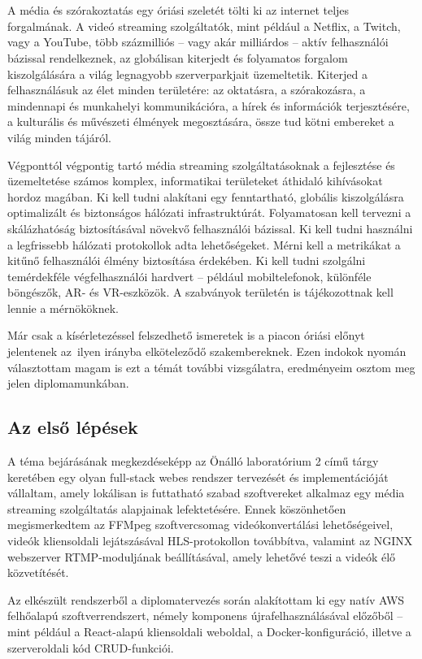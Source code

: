 \chapter{\bevezetes}

A média és szórakoztatás egy óriási szeletét tölti ki az internet teljes forgalmának. A videó streaming szolgáltatók, mint például a Netflix, a Twitch, vagy a YouTube, több százmilliós -- vagy akár milliárdos -- aktív felhasználói bázissal rendelkeznek, az globálisan kiterjedt és folyamatos forgalom kiszolgálására a világ legnagyobb szerverparkjait üzemeltetik. Kiterjed a felhasználásuk az élet minden területére: az oktatásra, a szórakozásra, a mindennapi és munkahelyi kommunikációra, a hírek és információk terjesztésére, a kulturális és művészeti élmények megosztására, össze tud kötni embereket a világ minden tájáról.

Végponttól végpontig tartó média streaming szolgáltatásoknak a fejlesztése és üzemeltetése számos komplex, informatikai területeket áthidaló kihívásokat hordoz magában. Ki kell tudni alakítani egy fenntartható, globális kiszolgálásra optimalizált és biztonságos hálózati infrastruktúrát. Folyamatosan kell tervezni a skálázhatóság biztosításával növekvő felhasználói bázissal. Ki kell tudni használni a legfrissebb hálózati protokollok adta lehetőségeket. Mérni kell a metrikákat a kitűnő felhasználói élmény biztosítása érdekében. Ki kell tudni szolgálni temérdekféle végfelhasználói hardvert -- például mobiltelefonok, különféle böngészők, AR- és VR-eszközök. A szabványok területén is tájékozottnak kell lennie a mérnököknek.

Már csak a kísérletezéssel felszedhető ismeretek is a piacon óriási előnyt jelentenek az~ilyen irányba elköteleződő szakembereknek. Ezen indokok nyomán választottam magam is ezt a témát további vizsgálatra, eredményeim osztom meg jelen diplomamunkában.

\section{Az első lépések}\label{sec:elso_lepesek}

A téma bejárásának megkezdéseképp az Önálló laboratórium 2 című tárgy keretében egy olyan full-stack webes rendszer tervezését és implementációját vállaltam, amely lokálisan is futtatható szabad szoftvereket alkalmaz egy média streaming szolgáltatás alapjainak lefektetésére. Ennek köszönhetően megismerkedtem az FFMpeg szoftvercsomag videókonvertálási lehetőségeivel, videók kliensoldali lejátszásával HLS-protokollon továbbítva, valamint az NGINX webszerver RTMP-moduljának beállításával, amely lehetővé teszi a videók élő közvetítését.

Az elkészült rendszerből a diplomatervezés során alakítottam ki egy natív AWS felhőalapú szoftverrendszert, némely komponens újrafelhasználásával előzőből -- mint például a React-alapú kliensoldali weboldal, a Docker-konfiguráció, illetve a szerveroldali kód CRUD-funkciói.
